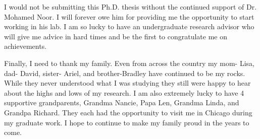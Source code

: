 I would not be submitting this Ph.D. thesis without the continued support of Dr. Mohamed Noor. I will forever owe him for providing me the opportunity to start working in his lab. I am so lucky to have an undergraduate research advisor who will give me advice in hard times and be the first to congratulate me on achievements. 

Finally, I need to thank my family. Even from across the country my mom- Lisa, dad- David, sister- Ariel, and brother-Bradley have continued to be my rocks. While they never understood what I was studying they still were happy to hear about the highs and lows of my research. I am also extremely lucky to have 4 supportive grandparents, Grandma Nancie, Papa Len, Grandma Linda, and Grandpa Richard. They each had the opportunity to visit me in Chicago during my graduate work. I hope to continue to make my family proud in the years to come.

